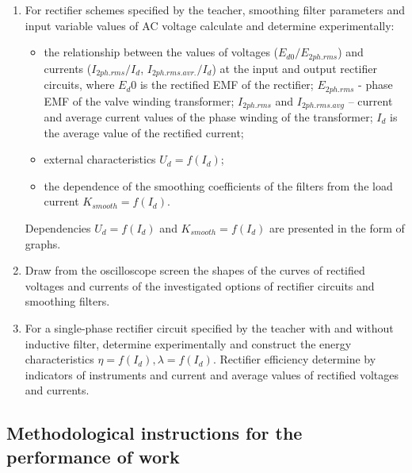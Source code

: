 \documentclass[a4paper,14pt]{article}
\begin{document}
\begin{enumerate}
	\item For rectifier schemes specified by the teacher, smoothing filter parameters and input variable values
of AC voltage calculate and determine experimentally:

\begin{itemize}
\item the relationship between the values of voltages ($E_{d0}/E_{2ph.rms}$) 
	and currents ($I_{2ph.rms} / I_d$, $I_{2ph.rms.avr.} / I_d$)  at the input and output rectifier circuits, 
where $E_d0$ is the rectified EMF of the rectifier; $E_{2ph.rms}$ - phase EMF of the valve winding
transformer; $I_{2ph.rms}$ and $I_{2ph.rms.avg}$ -- current and average current values of the phase winding 
of the transformer; $I_d$ is the average value of the rectified current;

\item external characteristics $U_d = f (I_d)$;

\item the dependence of the smoothing coefficients of the filters from the load current 
	$K_{smooth} = f (I_d)$.
\end{itemize}

	Dependencies $U_d = f (I_d)$ and $K_{smooth} = f (I_d)$ are presented in the form of graphs.

\item Draw from the oscilloscope screen the shapes of the curves of rectified voltages and currents 
of the investigated options of rectifier circuits and smoothing filters.

\item For a single-phase rectifier circuit specified by the teacher with and without inductive filter, determine
experimentally and construct the energy characteristics $\eta = f (I_d), \lambda = f (I_d)$. Rectifier efficiency
determine by indicators of instruments and current and average values of rectified voltages and currents.
\end{enumerate}

\subsection{Methodological instructions for the performance of work}
\end{document}
